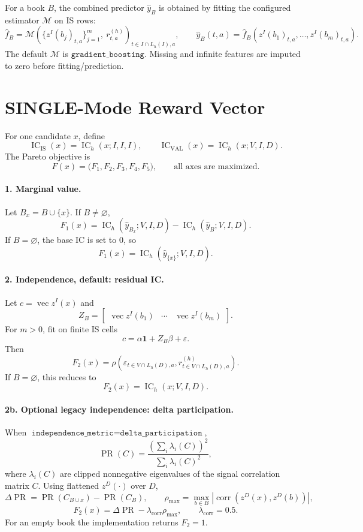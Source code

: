 \documentclass[11pt]{article}
\newcommand{\IC}{\operatorname{IC}}
\newcommand{\PR}{\operatorname{PR}}
\newcommand{\corr}{\operatorname{corr}}
\begin{document}
For a book \(B\), the combined predictor \(\widehat y_B\) is obtained by fitting
the configured estimator \(\mathcal M\) on IS rows:
\[
  \widehat f_B
  =
  \mathcal M\!\left(
    \{z^I(b_j)_{t,a}\}_{j=1}^m,\ r^{(h)}_{t,a}
  \right)_{t\in I\cap L_h(I),a},
  \qquad
  \widehat y_B(t,a)=\widehat f_B\!\left(z^I(b_1)_{t,a},\dots,z^I(b_m)_{t,a}\right).
\]
The default \(\mathcal M\) is \(\texttt{gradient\_boosting}\).  Missing and
infinite features are imputed to zero before fitting/prediction.

\section*{SINGLE-Mode Reward Vector}

For one candidate \(x\), define
\[
  \IC_{\mathrm{IS}}(x)=\IC_h(x;I,I,I),\qquad
  \IC_{\mathrm{VAL}}(x)=\IC_h(x;V,I,D).
\]
The Pareto objective is
\[
  F(x)=
  \bigl(F_1,F_2,F_3,F_4,F_5\bigr),
  \qquad \text{all axes are maximized}.
\]

\paragraph{1. Marginal value.}
Let \(B_x=B\cup\{x\}\).  If \(B\neq\varnothing\),
\[
  F_1(x)
  =
  \IC_h(\widehat y_{B_x};V,I,D)
  -
  \IC_h(\widehat y_B;V,I,D).
\]
If \(B=\varnothing\), the base IC is set to \(0\), so
\[
  F_1(x)=\IC_h(\widehat y_{\{x\}};V,I,D).
\]

\paragraph{2. Independence, default: residual IC.}
Let \(c=\operatorname{vec} z^I(x)\) and
\[
  Z_B=\begin{bmatrix}
  \operatorname{vec} z^I(b_1) & \cdots & \operatorname{vec} z^I(b_m)
  \end{bmatrix}.
\]
For \(m>0\), fit on finite IS cells
\[
  c=\alpha\mathbf 1 + Z_B\beta+\varepsilon.
\]
Then
\[
  F_2(x)=
  \rho\!\left(
    \varepsilon_{t\in V\cap L_h(D),a},
    r^{(h)}_{t\in V\cap L_h(D),a}
  \right).
\]
If \(B=\varnothing\), this reduces to
\[
  F_2(x)=\IC_h(x;V,I,D).
\]

\paragraph{2b. Optional legacy independence: delta participation.}
When \(\texttt{independence\_metric}=\texttt{delta\_participation}\),
\[
  \PR(C)=\frac{\left(\sum_i\lambda_i(C)\right)^2}{\sum_i\lambda_i(C)^2},
\]
where \(\lambda_i(C)\) are clipped nonnegative eigenvalues of the signal
correlation matrix \(C\).  Using flattened \(z^D(\cdot)\) over \(D\),
\[
  \Delta\PR=\PR(C_{B\cup x})-\PR(C_B),\qquad
  \rho_{\max}=\max_{b\in B}\left|\corr(z^D(x),z^D(b))\right|,
\]
\[
  F_2(x)=\Delta\PR-\lambda_{\mathrm{corr}}\rho_{\max},
  \qquad \lambda_{\mathrm{corr}}=0.5.
\]
For an empty book the implementation returns \(F_2=1\).
\end{document}
